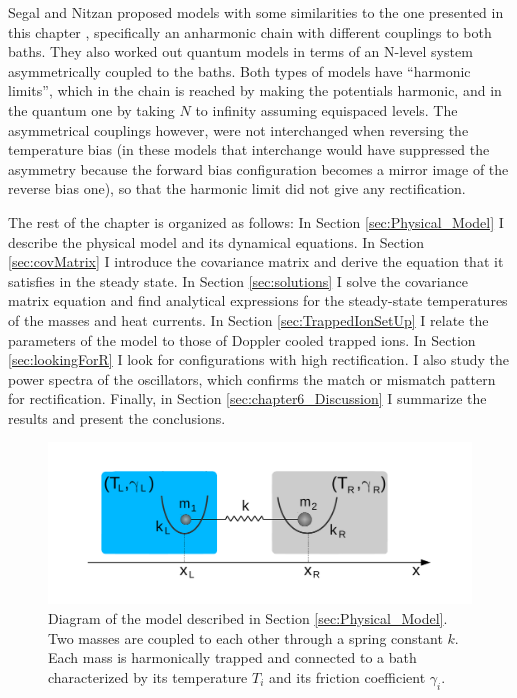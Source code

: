 Segal and Nitzan proposed models with some similarities to the one presented in this chapter \cite{Segal2005,Segal2005b}, specifically an anharmonic chain
with different couplings to both baths. They also worked out quantum models \cite{Segal2005,Segal2005b} in terms of an N-level
system asymmetrically coupled to the baths. Both types of models have ``harmonic limits'', which in the chain is reached by making the potentials
harmonic, and in the quantum one by taking $N$ to infinity assuming equispaced levels.
The asymmetrical couplings however, were not interchanged when reversing the temperature bias
(in these models that interchange would have suppressed the asymmetry because the forward bias configuration becomes a mirror image of the reverse bias one), so that
the harmonic limit did not give any rectification.

The rest of the chapter is organized as follows: In Section \ref{sec:Physical_Model}
I describe the physical model and its dynamical equations. In Section \ref{sec:covMatrix} I introduce the covariance matrix and derive the equation that it satisfies in the steady state. In Section \ref{sec:solutions} I solve the covariance matrix equation and find analytical expressions for the steady-state temperatures of the masses and heat currents. In Section \ref{sec:TrappedIonSetUp} I relate the parameters of the model to those of Doppler cooled trapped ions. In Section \ref{sec:lookingForR} I look for configurations with high rectification. I also study the power spectra of the oscillators, which confirms the match or mismatch pattern for rectification. Finally, in Section \ref{sec:chapter6_Discussion} I summarize the results and present the conclusions.

\begin{figure}
  \center
  \includegraphics[width=0.75\linewidth]{Figures/model_diagram.pdf}
  \caption{Diagram of the model described in Section \ref{sec:Physical_Model}. Two masses are coupled to each other through a spring constant $k$. Each mass is harmonically trapped and connected to a bath characterized by its temperature $T_i$ and its friction coefficient $\gamma_i$. }
  \label{fig:model_diagram}
\end{figure}
%
%
%
%
